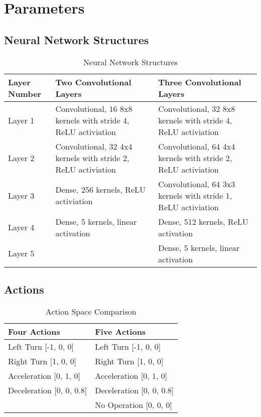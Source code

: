 \chapter{Parameters}\label{Parameters}

\section{Neural Network Structures}
\begin{table}[h!]
\begin{center}
\begin{tabular}{|P{3cm}|P{6cm}|P{6cm}|}
\hline
Layer Number & Two Convolutional Layers & Three Convolutional Layers\\
\hline
Layer 1 & Convolutional, 16 8x8 kernels with stride 4, 
ReLU activiation & Convolutional, 32 8x8 kernels with stride 4, 
ReLU activiation\\
\hline
Layer 2 & Convolutional, 32 4x4 kernels with stride 2, 
ReLU activiation & Convolutional, 64 4x4 kernels with stride 2, 
ReLU activiation\\
\hline
Layer 3 & Dense, 256 kernels, ReLU activiation & Convolutional, 64 3x3 kernels with stride 1, ReLU activiation\\
\hline
Layer 4 & Dense, 5 kernels, linear activation & Dense, 512 kernels, ReLU activation\\
\hline
Layer 5 &  & Dense, 5 kernels, linear activation\\
\hline
\end{tabular}
\caption{Neural Network Structures}
\label{table: neuralstructures}
\end{center}
\end{table}

\section{Actions}
\begin{table}[h!]
\begin{center}
\begin{tabular}{|P{6cm}|P{6cm}|}
\hline
Four Actions & Five Actions\\
\hline
Left Turn [-1, 0, 0] & Left Turn [-1, 0, 0]\\
\hline
Right Turn [1, 0, 0] & Right Turn [1, 0, 0]\\
\hline
Acceleration [0, 1, 0] & Acceleration [0, 1, 0]\\
\hline
Deceleration [0, 0, 0.8] & Deceleration [0, 0, 0.8]\\
\hline
 & No Operation [0, 0, 0]\\
\hline
\end{tabular}
\caption{Action Space Comparison}
\label{table: ActionSpace}
\end{center}
\end{table}

